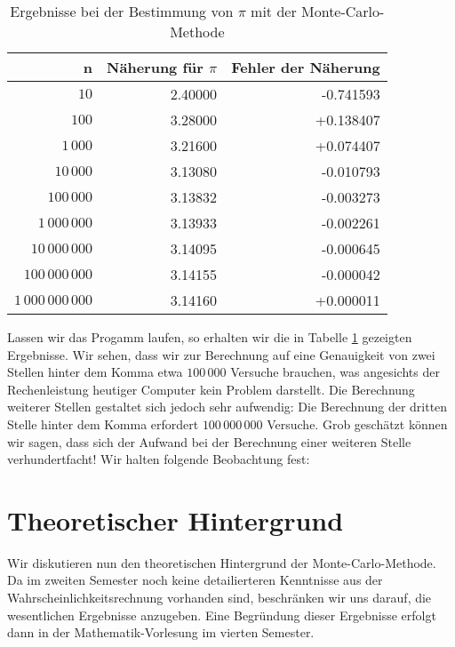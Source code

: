\begin{table}[htbp]
  \label{tab:pi}
  \centering
  \begin{tabular}[t]{|r|r|r|}
  \hline
  n & N\"aherung f\"ur $\pi$ & Fehler der N\"aherung \\
  \hline
  \hline
               $10$ & 2.40000 & -0.741593 \\
\hline
              $100$ & 3.28000 & +0.138407 \\
\hline
           $1\,000$ & 3.21600 & +0.074407 \\
\hline
          $10\,000$ & 3.13080 & -0.010793 \\
\hline
         $100\,000$ & 3.13832 & -0.003273 \\
\hline
      $1\,000\,000$ & 3.13933 & -0.002261 \\
\hline
     $10\,000\,000$ & 3.14095 & -0.000645 \\
\hline
    $100\,000\,000$ & 3.14155 & -0.000042 \\
\hline
 $1\,000\,000\,000$ & 3.14160 & +0.000011 \\
\hline
  \end{tabular}
  \caption{Ergebnisse bei der Bestimmung von $\pi$ mit der Monte-Carlo-Methode}
\end{table}

Lassen wir das Progamm laufen, so erhalten wir die in Tabelle \ref{tab:pi} gezeigten Ergebnisse.
Wir sehen, dass wir zur Berechnung auf eine Genauigkeit von zwei Stellen hinter dem Komma etwa $100\,000$
Versuche brauchen, was angesichts der Rechenleistung heutiger Computer kein Problem darstellt.  Die Berechnung
weiterer Stellen gestaltet sich jedoch sehr aufwendig:  Die Berechnung der dritten Stelle hinter dem Komma
erfordert  $100\,000\,000$ Versuche. Grob gesch\"atzt k\"onnen wir
sagen, dass sich der Aufwand bei der Berechnung einer weiteren Stelle verhundertfacht!  
Wir halten folgende Beobachtung fest:

\begin{center}
\end{center}

\section{Theoretischer Hintergrund}
Wir diskutieren nun den theoretischen Hintergrund der Monte-Carlo-Methode.  Da im zweiten Semester noch
keine detailierteren Kenntnisse aus der Wahrscheinlichkeitsrechnung vorhanden sind, beschr\"anken wir
uns darauf, die wesentlichen Ergebnisse anzugeben.  Eine Begr\"undung dieser Ergebnisse erfolgt dann
in der Mathematik-Vorlesung im vierten Semester. 

